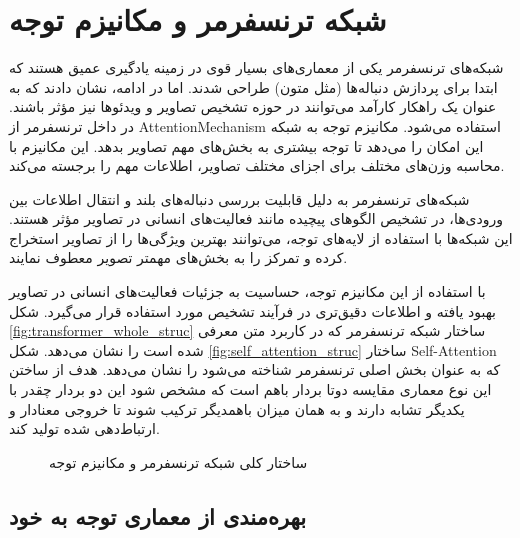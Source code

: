 \section{شبکه ترنسفرمر و مکانیزم توجه}

شبکه‌های ترنسفرمر یکی از معماری‌های بسیار قوی در زمینه یادگیری عمیق هستند که ابتدا برای پردازش دنباله‌ها (مثل متون) طراحی شدند.
\cite{AttentionIsAllNeed}
 اما در ادامه، نشان دادند که به عنوان یک راهکار کارآمد می‌توانند در حوزه تشخیص تصاویر و ویدئوها نیز مؤثر باشند. در داخل ترنسفرمر از %
\gls{AttentionMechanism}
استفاده می‌شود.
مکانیزم توجه به شبکه این امکان را می‌دهد تا توجه بیشتری به بخش‌های مهم تصاویر بدهد. این مکانیزم با محاسبه وزن‌های مختلف برای اجزای مختلف تصاویر، اطلاعات مهم را برجسته می‌کند. 

شبکه‌های ترنسفرمر به دلیل قابلیت بررسی دنباله‌های بلند و انتقال اطلاعات بین ورودی‌ها، در تشخیص الگوهای پیچیده مانند فعالیت‌های انسانی در تصاویر مؤثر هستند. این شبکه‌ها با استفاده از لایه‌های توجه، می‌توانند بهترین ویژگی‌ها را از تصاویر استخراج کرده و تمرکز را به بخش‌های مهمتر تصویر معطوف نمایند.

با استفاده از این مکانیزم توجه، حساسیت به جزئیات فعالیت‌های انسانی در تصاویر بهبود یافته و اطلاعات دقیق‌تری در فرآیند تشخیص مورد استفاده قرار می‌گیرد.
شکل%
\ref{fig:transformer_whole_struc}
 ساختار شبکه ترنسفرمر که در کاربرد متن معرفی شده است را نشان می‌دهد. شکل%
\ref{fig:self_attention_struc}
 ساختار
\gls{Self-Attention}
که به عنوان بخش اصلی ترنسفرمر شناخته می‌شود را نشان می‌دهد. هدف از ساختن این نوع معماری مقایسه دوتا بردار باهم است که مشخص شود این دو بردار چقدر با یکدیگر تشابه دارند و به همان میزان باهمدیگر ترکیب شوند تا خروجی معنادار و ارتباط‌دهی شده تولید کند.
\begin{figure}
	\centering
	
	\hfill
	
	\caption[ساختار کلی شبکه ترنسفرمر و مکانیزم توجه]{ساختار کلی شبکه ترنسفرمر و مکانیزم توجه
		\cite{AttentionIsAllNeed}
	}
	\label{fig:mainfigure}
\end{figure}

\subsection{بهره‌مندی از معماری توجه به خود}

